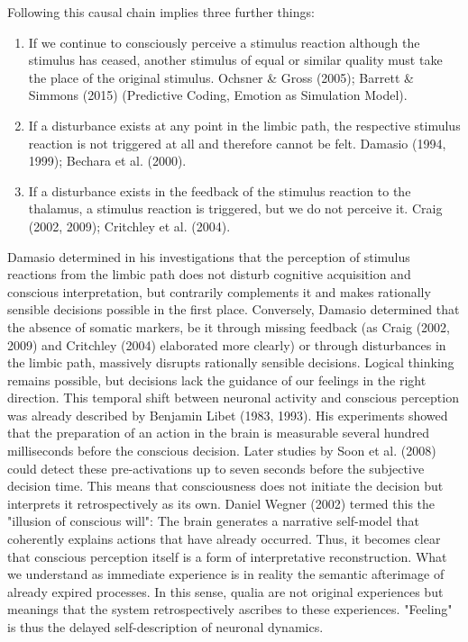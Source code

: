 Following this causal chain implies three further things:
\begin{enumerate}
    \item If we continue to consciously perceive a stimulus reaction although the stimulus has ceased, another stimulus of equal or similar quality must take the place of the original stimulus.
    Ochsner & Gross (2005); Barrett & Simmons (2015) (Predictive Coding, Emotion as Simulation Model).
    \item If a disturbance exists at any point in the limbic path, the respective stimulus reaction is not triggered at all and therefore cannot be felt.
    Damasio (1994, 1999); Bechara et al. (2000).
    \item If a disturbance exists in the feedback of the stimulus reaction to the thalamus, a stimulus reaction is triggered, but we do not perceive it.
    Craig (2002, 2009); Critchley et al. (2004).
\end{enumerate}

Damasio determined in his investigations that the perception of stimulus reactions from the limbic path does not disturb cognitive acquisition and conscious interpretation, but contrarily complements it and makes rationally sensible decisions possible in the first place.
Conversely, Damasio determined that the absence of somatic markers, be it through missing feedback (as Craig (2002, 2009) and Critchley (2004) elaborated more clearly) or through disturbances in the limbic path, massively disrupts rationally sensible decisions.
Logical thinking remains possible, but decisions lack the guidance of our feelings in the right direction.
This temporal shift between neuronal activity and conscious perception was already described by Benjamin Libet (1983, 1993).
His experiments showed that the preparation of an action in the brain is measurable several hundred milliseconds before the conscious decision.
Later studies by Soon et al. (2008) could detect these pre-activations up to seven seconds before the subjective decision time.
This means that consciousness does not initiate the decision but interprets it retrospectively as its own.
Daniel Wegner (2002) termed this the "illusion of conscious will": The brain generates a narrative self-model that coherently explains actions that have already occurred.
Thus, it becomes clear that conscious perception itself is a form of interpretative reconstruction.
What we understand as immediate experience is in reality the semantic afterimage of already expired processes.
In this sense, qualia are not original experiences but meanings that the system retrospectively ascribes to these experiences.
"Feeling" is thus the delayed self-description of neuronal dynamics.

